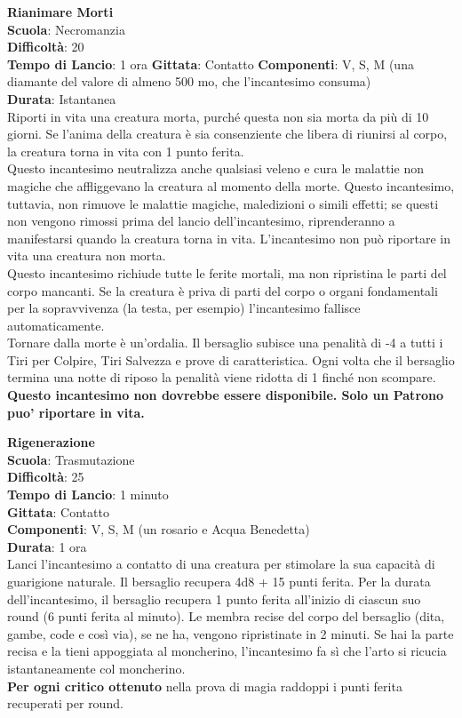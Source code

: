 \begin{multicols}{2}
\medskip\textbf{Rianimare Morti}\\
\textbf{Scuola}: Necromanzia\\
\textbf{Difficoltà}: 20\\
\textbf{Tempo di Lancio}: 1 ora
\textbf{Gittata}: Contatto
\textbf{Componenti}: V, S, M (una diamante del valore di almeno 500 mo, che l'incantesimo consuma)\\
\textbf{Durata}: Istantanea\\
Riporti in vita una creatura morta, purché questa non sia morta da più di 10 giorni. Se l'anima della creatura è sia consenziente che libera di riunirsi al corpo, la creatura torna in vita con 1 punto ferita.\\
Questo incantesimo neutralizza anche qualsiasi veleno e cura le malattie non magiche che affliggevano la creatura al momento della morte. Questo incantesimo, tuttavia, non rimuove le malattie magiche, maledizioni o simili effetti; se questi non vengono rimossi prima del lancio dell'incantesimo, riprenderanno a manifestarsi quando la creatura torna in vita. L'incantesimo non può riportare in vita una creatura non morta.\\
Questo incantesimo richiude tutte le ferite mortali, ma non ripristina le parti del corpo mancanti. Se la creatura è priva di parti del corpo o organi fondamentali per la sopravvivenza (la testa, per esempio) l'incantesimo fallisce automaticamente.\\
Tornare dalla morte è un'ordalia. Il bersaglio subisce una penalità di -4 a tutti i Tiri per Colpire, Tiri Salvezza e prove di caratteristica. Ogni volta che il bersaglio termina una notte di riposo la penalità viene ridotta di 1 finché non scompare.\\
\textbf{Questo incantesimo non dovrebbe essere disponibile. Solo un Patrono puo' riportare in vita.}

\medskip\textbf{Rigenerazione}\\
\textbf{Scuola}: Trasmutazione\\
\textbf{Difficoltà}: 25\\
\textbf{Tempo di Lancio}: 1 minuto\\
\textbf{Gittata}: Contatto\\
\textbf{Componenti}: V, S, M (un rosario e Acqua Benedetta)\\
\textbf{Durata}: 1 ora\\
Lanci l'incantesimo a contatto di una creatura per stimolare la sua capacità di guarigione naturale. Il bersaglio recupera 4d8 + 15 punti ferita. Per la durata dell'incantesimo, il bersaglio recupera 1 punto ferita all'inizio di ciascun suo round (6 punti ferita al minuto). Le membra recise del corpo del bersaglio (dita, gambe, code e così via), se ne ha, vengono ripristinate in 2 minuti. Se hai la parte recisa e la tieni appoggiata al moncherino, l'incantesimo fa sì che l'arto si ricucia istantaneamente col moncherino.\\
\textbf{Per ogni critico ottenuto} nella prova di magia raddoppi i punti ferita recuperati per round.


\end{multicols}
